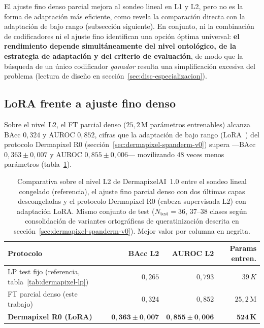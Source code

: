 El ajuste fino denso parcial mejora al sondeo lineal en L1 y L2, pero
no es la forma de adaptación más eficiente, como revela la comparación
directa con la adaptación de bajo rango (subsección siguiente). En
conjunto, ni la combinación de codificadores ni el ajuste fino
identifican una opción óptima universal: \textbf{el rendimiento
depende simultáneamente del nivel ontológico, de la estrategia de
adaptación y del criterio de evaluación}, de modo que la búsqueda de un
único codificador \emph{ganador} resulta una simplificación excesiva
del problema (lectura de diseño en
sección~\ref{sec:disc-especializacion}).

\subsection{LoRA frente a ajuste fino denso}

Sobre el nivel L2, el FT parcial denso ($25{,}2$\,M parámetros
entrenables) alcanza BAcc $0{,}324$ y AUROC $0{,}852$, cifras que la
adaptación de bajo rango (LoRA~\cite{lora}) del protocolo Dermapixel
R0 (sección~\ref{sec:dermapixel-spanderm-v0}) supera ---BAcc
$0{,}363 \pm 0{,}007$ y AUROC $0{,}855 \pm 0{,}006$--- movilizando
$48$ veces menos parámetros
(tabla~\ref{tab:dermapixel-ft-vs-lora}).

\begin{table}[H]
\centering
\footnotesize
\setlength{\tabcolsep}{4pt}
\renewcommand{\arraystretch}{0.95}
\caption{Comparativa sobre el nivel L2 de DermapixelAI~1.0 entre el
sondeo lineal congelado (referencia), el ajuste fino parcial denso
con dos últimas capas descongeladas y el protocolo Dermapixel R0
(cabeza supervisada L2) con
adaptación LoRA. Mismo conjunto de test ($N_{\mathrm{test}} = 36$,
$37$--$38$ clases según consolidación de variantes ortográficas
de queratinización descrita en
sección~\ref{sec:dermapixel-spanderm-v0}). Mejor valor por
columna en negrita.}
\label{tab:dermapixel-ft-vs-lora}
\begin{tabular}{lrrr}
\hline
Protocolo                       & BAcc L2                         & AUROC L2                       & Params entren. \\
\hline
LP test fijo (referencia, tabla~\ref{tab:dermapixel-lp}) & $0{,}265$                       & $0{,}793$                      & $39\,K$ \\
FT parcial denso (este trabajo) & $0{,}324$                       & $0{,}852$                      & $25{,}2$\,M \\
\textbf{Dermapixel R0 (LoRA)}   & $\mathbf{0{,}363 \pm 0{,}007}$  & $\mathbf{0{,}855 \pm 0{,}006}$ & $\mathbf{524\,K}$ \\
\hline
\end{tabular}
\end{table}

